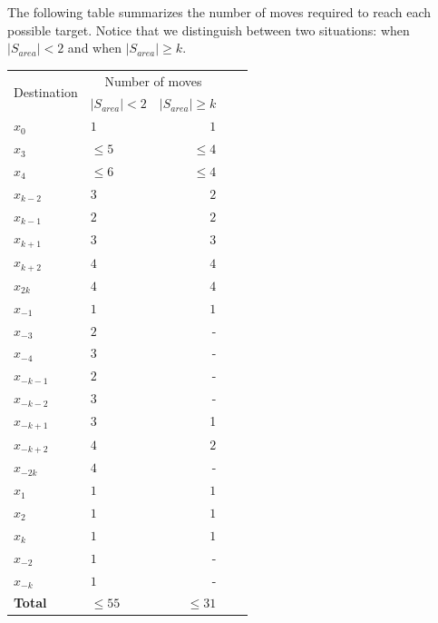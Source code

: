 The following table summarizes the number of moves required to reach each possible target. Notice that we distinguish between two situations: when $\left\vert{S_{area}}\right\vert < 2$ and  when $\left\vert{S_{area}}\right\vert \ge k$.
\begin{center}
\begin{tabular}{|l|lr|lr|}\hline
\multirow{2}{1 in}{Destination} &
\multicolumn{2}{c|}{Number of moves}
\\
& $\left\vert{S_{area}}\right\vert < 2$ & $\left\vert{S_{area}}\right\vert \ge k$ \\\hline\hline
$x_0$       & $1$ & $1$  \\\hline

$x_{3}$    & $\leq5$   & $\leq4$     \\\hline
$x_{4}$    & $\leq6$   & $\leq4$     \\\hline
$x_{k-2}$ & $3$   & $2$         \\\hline
$x_{k-1}$ & $2$   & $2$         \\\hline
$x_{k+1}$ & $3$   & $3$         \\\hline
$x_{k+2}$ & $4$   & $4$         \\\hline
$x_{2k}$            & $ 4$   & $ 4$        \\\hline
$x_{-1}$            & $ 1$   & $ 1$        \\\hline

$x_{-3}$    & $2$   & -     \\\hline
$x_{-4}$ & $3$   & -        \\\hline
$x_{-k-1}$            & $2$   & -        \\\hline
$x_{-k-2}$            & $3$   & -        \\\hline
$x_{-k+1}$    & $3$   & 1    \\\hline
$x_{-k+2}$            & $4$   & $2$       \\\hline
$x_{-2k}$ & $4$   & -        \\\hline

$x_1$       & $1$ & $1$  \\\hline
$x_2$       & $1$ & $1$  \\\hline
$x_k$       & $1$ & $1$  \\\hline
$x_{-2}$    & $1$   & -    \\\hline
$x_{-k}$       & $1$ & -  \\\hline
{\bf Total}     & $\leq 55$   & $\leq 31$ \\\hline
\end{tabular}
\end{center}




